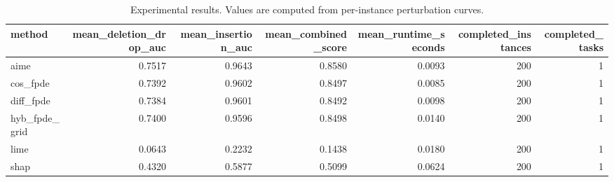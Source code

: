\begin{table}[t]
\caption{Experimental results. Values are computed from per-instance perturbation curves.}
\label{tab:main_results_computed}
\centering
\begin{tabular}{lrrrrrr}
\toprule
method & mean\_deletion\_drop\_auc & mean\_insertion\_auc & mean\_combined\_score & mean\_runtime\_seconds & completed\_instances & completed\_tasks \\
\midrule
aime & 0.7517 & 0.9643 & 0.8580 & 0.0093 & 200 & 1 \\
cos\_fpde & 0.7392 & 0.9602 & 0.8497 & 0.0085 & 200 & 1 \\
diff\_fpde & 0.7384 & 0.9601 & 0.8492 & 0.0098 & 200 & 1 \\
hyb\_fpde\_grid & 0.7400 & 0.9596 & 0.8498 & 0.0140 & 200 & 1 \\
lime & 0.0643 & 0.2232 & 0.1438 & 0.0180 & 200 & 1 \\
shap & 0.4320 & 0.5877 & 0.5099 & 0.0624 & 200 & 1 \\
\bottomrule
\end{tabular}

\end{table}
